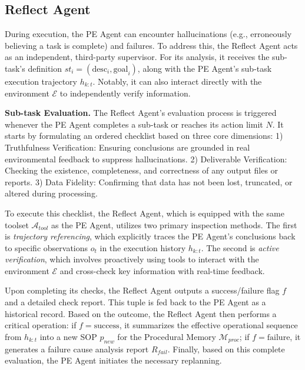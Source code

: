 \subsection{Reflect Agent}
\label{sec:reflect agent}

During execution, the PE Agent can encounter hallucinations (e.g., erroneously believing a task is complete) and failures. To address this, the Reflect Agent acts as an independent, third-party supervisor. For its analysis, it receives the sub-task's definition $st_i = (\text{desc}_i, \text{goal}_i)$, along with the PE Agent's sub-task execution trajectory $h_{k:t}$. Notably, it can also interact directly with the environment $\mathcal{E}$ to independently verify information.

\textbf{Sub-task Evaluation.}
The Reflect Agent's evaluation process is triggered whenever the PE Agent completes a sub-task or reaches its action limit $N$. It starts by formulating an ordered checklist based on three core dimensions:
1) Truthfulness Verification: Ensuring conclusions are grounded in real environmental feedback to suppress hallucinations.
2) Deliverable Verification: Checking the existence, completeness, and correctness of any output files or reports.
3) Data Fidelity: Confirming that data has not been lost, truncated, or altered during processing.

To execute this checklist, the Reflect Agent, which is equipped with the same toolset $\mathcal{A}_{tool}$ as the PE Agent, utilizes two primary inspection methods. The first is \textit{trajectory referencing}, which explicitly traces the PE Agent's conclusions back to specific observations $o_t$ in the execution history $h_{k:t}$. The second is \textit{active verification}, which involves proactively using tools to interact with the environment $\mathcal{E}$ and cross-check key information with real-time feedback.

Upon completing its checks, the Reflect Agent outputs a success/failure flag $f$ and a detailed check report. This tuple is fed back to the PE Agent as a historical record. Based on the outcome, the Reflect Agent then performs a critical operation: if $f=\text{success}$, it summarizes the effective operational sequence from $h_{k:t}$ into a new SOP $p_{new}$ for the Procedural Memory $\mathcal{M}_{proc}$; if $f=\text{failure}$, it generates a failure cause analysis report $R_{fail}$. Finally, based on this complete evaluation, the PE Agent initiates the necessary replanning.

